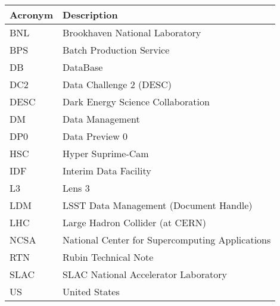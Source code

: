 \addtocounter{table}{-1}
\begin{longtable}{p{}p{}}\hline
\textbf{Acronym} & \textbf{Description}  \\\hline

BNL & Brookhaven National Laboratory \\\hline
BPS & Batch Production Service \\\hline
DB & DataBase \\\hline
DC2 & Data Challenge 2 (DESC) \\\hline
DESC & Dark Energy Science Collaboration \\\hline
DM & Data Management \\\hline
DP0 & Data Preview 0 \\\hline
HSC & Hyper Suprime-Cam \\\hline
IDF & Interim Data Facility \\\hline
L3 & Lens 3 \\\hline
LDM & LSST Data Management (Document Handle) \\\hline
LHC & Large Hadron Collider (at CERN) \\\hline
NCSA & National Center for Supercomputing Applications \\\hline
RTN & Rubin Technical Note \\\hline
SLAC & SLAC National Accelerator Laboratory \\\hline
US & United States \\\hline
\end{longtable}
